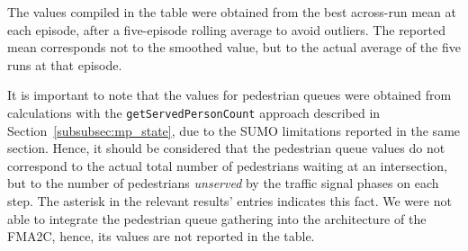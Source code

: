 The values compiled in the table were obtained from the best across-run mean at each episode, after a five-episode rolling average to avoid outliers. The reported mean corresponds not to the smoothed value, but to the actual average of the five runs at that episode.

It is important to note that the values for pedestrian queues were obtained from calculations with the \texttt{getServedPersonCount} approach described in Section~\ref{subsubsec:mp_state}, due to the SUMO limitations reported in the same section. Hence, it should be considered that the pedestrian queue values do not correspond to the actual total number of pedestrians waiting at an intersection, but to the number of pedestrians \textit{unserved} by the traffic signal phases on each step. The asterisk in the relevant results' entries indicates this fact. We were not able to integrate the pedestrian queue gathering into the architecture of the FMA2C, hence, its values are not reported in the table.

